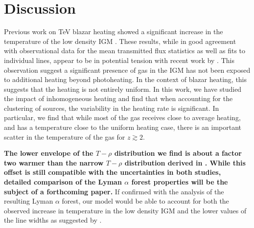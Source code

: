 \documentclass[numberedappendix]{emulateapj}
\newcommand\ALc[1]{{\color{red} \bf #1}} %
\begin{document}
\section{Discussion}
Previous work on TeV blazar heating showed a significant increase in the temperature of the low density IGM \citep{2012ApJ...752...23C,2012MNRAS.423..149P}. These results, while in good agreement with observational data for the mean transmitted flux statistics as well as fits to individual lines, appear to be in potential tension with recent work by \citet{2012ApJ...757L..30R}. This observation suggest a significant presence of gas in the IGM has not been exposed to additional heating beyond photoheating. In the context of blazar heating, this suggests that the heating is not entirely uniform. In this work, we have studied the impact of inhomogeneous heating and find that when accounting for the clustering of sources, the variability in the heating rate is significant. In particular, we find that while most of the gas receives close to average heating, and has a temperature close to the uniform heating case, there is an important scatter in the temperature of the gas  for $z\gtrsim 2$. 

\ALc{The lower envelope of the $T-\rho$ distribution we find is about a factor two warmer than the narrow $T-\rho$ distribution derived in \citet{2014MNRAS.438.2499B}. While this offset is still compatible with the uncertainties in both studies, detailed comparison of the Lyman $\alpha$ forest properties will be the subject of a forthcoming paper.} If confirmed with the analysis of the resulting Lyman $\alpha$ forest, our model would be able to account for both the observed increase in temperature in the low density IGM \citep{2014MNRAS.441.1916B,2009MNRAS.399L..39V} and the lower values of the line widths as suggested by \citet{2012ApJ...757L..30R}.
\end{document}
